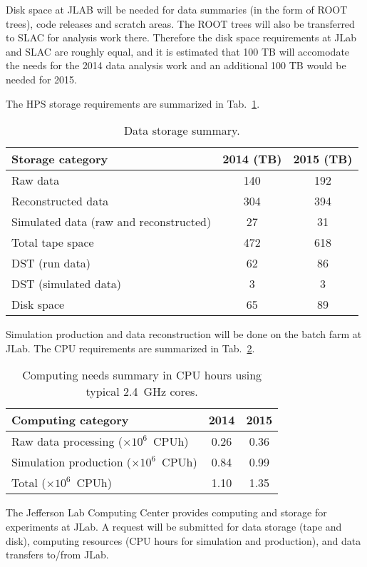 Disk space at JLAB will be 
needed for data summaries (in the form of ROOT trees), code releases and scratch areas. 
The ROOT trees will also be transferred to SLAC for analysis work there.
Therefore the disk space requirements at JLab and SLAC are roughly equal, and it is estimated that
100 TB will accomodate the needs for the 2014 data analysis work
and an additional 100 TB would be needed for 2015.

The HPS storage requirements are summarized in Tab.~\ref{tab:datastorage}.
\begin{table}[tbp]
\centering
\begin{tabular}{|l|c|c|}
\hline
Storage category & 2014 (TB) & 2015 (TB) \\
\hline
Raw data & 140 & 192 \\
Reconstructed data & 304 & 394 \\
Simulated data (raw and reconstructed) & 27 & 31 \\
\hline
Total tape space & 472 & 618 \\
\hline
DST (run data) & 62 & 86 \\
DST (simulated data) & 3 & 3 \\
\hline
Disk space  & 65  & 89 \\
\hline
\end{tabular}
\caption{{\small Data storage summary.}}
\label{tab:datastorage}
\end{table}

Simulation production and data reconstruction will be done on the batch farm at JLab. The CPU requirements 
are summarized in Tab.~\ref{tab:computing}.
\begin{table}[tbp]
\centering
\begin{tabular}{|l|c|c|}
\hline
Computing category & 2014& 2015 \\
\hline
Raw data processing ($\times 10^{6}$~CPUh)  & 0.26 & 0.36 \\
Simulation production ($\times 10^{6}$~CPUh) & 0.84 & 0.99 \\
\hline
Total ($\times 10^{6}$~CPUh) & 1.10 & 1.35 \\
\hline
\end{tabular}
\caption{{\small Computing needs summary in CPU hours using typical 2.4~GHz cores.}}
\label{tab:computing}
\end{table}

The Jefferson Lab Computing Center provides computing and storage for experiments at JLab. 
A request will be submitted for data storage (tape and disk), computing resources (CPU hours for simulation and production), and data transfers to/from JLab.
